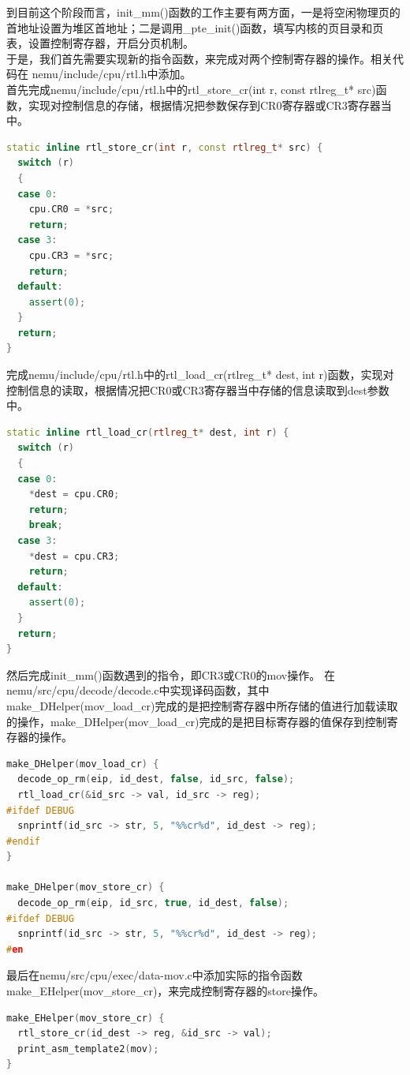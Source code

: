 \documentclass[UTF8,a4paper,10pt]{ctexart}
\begin{document}
到目前这个阶段而言，init\_mm()函数的工作主要有两方面，一是将空闲物理页的首地址设置为堆区首地址；二是调用\_pte\_init()函数，填写内核的页目录和页表，设置控制寄存器，开启分页机制。\\ 
于是，我们首先需要实现新的指令函数，来完成对两个控制寄存器的操作。相关代码在 nemu/include/cpu/rtl.h中添加。\\ 
首先完成nemu/include/cpu/rtl.h中的rtl\_store\_cr(int r, const rtlreg\_t* src)函数，实现对控制信息的存储，根据情况把参数保存到CR0寄存器或CR3寄存器当中。
\begin{lstlisting}[language = C++]
static inline rtl_store_cr(int r, const rtlreg_t* src) {
  switch (r)
  {
  case 0:
    cpu.CR0 = *src;
    return;
  case 3:
    cpu.CR3 = *src;
    return;
  default:
    assert(0);
  }
  return;
}
\end{lstlisting}

完成nemu/include/cpu/rtl.h中的rtl\_load\_cr(rtlreg\_t* dest, int r)函数，实现对控制信息的读取，根据情况把CR0或CR3寄存器当中存储的信息读取到dest参数中。

\begin{lstlisting}[language = C++]
static inline rtl_load_cr(rtlreg_t* dest, int r) {
  switch (r)
  {
  case 0:
    *dest = cpu.CR0;
    return;
    break;
  case 3:
    *dest = cpu.CR3;
    return;
  default:
    assert(0);
  }
  return;
}
\end{lstlisting}

然后完成init\_mm()函数遇到的指令，即CR3或CR0的mov操作。
在 nemu/src/cpu/decode/decode.c中实现译码函数，其中make\_DHelper(mov\_load\_cr)完成的是把控制寄存器中所存储的值进行加载读取的操作，make\_DHelper(mov\_load\_cr)完成的是把目标寄存器的值保存到控制寄存器的操作。
\begin{lstlisting}[language = C++]
make_DHelper(mov_load_cr) {
  decode_op_rm(eip, id_dest, false, id_src, false);
  rtl_load_cr(&id_src -> val, id_src -> reg);
#ifdef DEBUG
  snprintf(id_src -> str, 5, "%%cr%d", id_dest -> reg);
#endif
}

make_DHelper(mov_store_cr) {
  decode_op_rm(eip, id_src, true, id_dest, false);
#ifdef DEBUG
  snprintf(id_src -> str, 5, "%%cr%d", id_dest -> reg);
#en
\end{lstlisting}


最后在nemu/src/cpu/exec/data-mov.c中添加实际的指令函数make\_EHelper(mov\_store\_cr)，来完成控制寄存器的store操作。
\begin{lstlisting}[language = C++]
make_EHelper(mov_store_cr) {
  rtl_store_cr(id_dest -> reg, &id_src -> val);
  print_asm_template2(mov);
}
\end{lstlisting}
\end{document}

